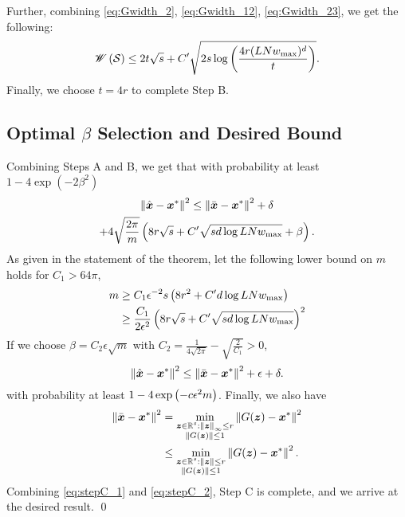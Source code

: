 \documentclass[journal]{IEEEtran}
\newcommand{\wid}{\mathscr{W}}
\begin{document}
Further, combining \eqref{eq:Gwidth_2}, \eqref{eq:Gwidth_12}, \eqref{eq:Gwidth_23}, we get the following:
\begin{equation}
\wid\lb \calS\rb\leq 2t\sqrt{s}+C'\sqrt{2s\log \lb\frac{4r(LNw_{\max})^d}{t}\rb}.
\end{equation}
Finally, we choose $t=4r$ to complete Step B.

\subsection{Optimal $\beta$ Selection and Desired Bound}
Combining  Steps A and B, we get that with probability at least $1-4\exp(-2\beta^2)$
\begin{multline}\label{eq:theory_1}
\left\Vert\hat{\boldsymbol{x}}-\boldsymbol{x}^*\right\Vert^2\leq \left\Vert\bar{\boldsymbol{x}}-\boldsymbol{x}^*\right\Vert^2+\delta\\+4\sqrt{\frac{2\pi }{m}}\left( 8r\sqrt{s}+C'\sqrt{sd\log LNw_{\max}} +\beta\right).
\end{multline}
As given in the statement of the theorem, let the following lower bound on $m$ holds for $C_1>64\pi$,
 \begin{align}\label{eq:num_mes}
m&\geq C_1\epsilon^{-2}s\left( 8r^2+C'd\log LNw_{\max} \right)\\
&\geq \frac{C_1}{2\epsilon^2}\left( 8r\sqrt{s}+C'\sqrt{sd\log LNw_{\max}} \right)^2
\end{align} 
If we choose $\beta= C_2\epsilon\sqrt{m}$ with $C_2=\frac{1}{4\sqrt{2\pi}}-\sqrt{\frac{2}{C_1}}>0$, 
\begin{equation}\label{eq:stepC_1}
\left\Vert\hat{\boldsymbol{x}}-\boldsymbol{x}^*\right\Vert^2\leq \left\Vert\bar{\boldsymbol{x}}-\boldsymbol{x}^*\right\Vert^2+\epsilon+\delta.
\end{equation}
 with probability at least $1-4\exp\left(-c\epsilon^2m\right)$. Finally, we also have
\begin{align}
\left\Vert\bar{\boldsymbol{x}}-\boldsymbol{x}^*\right\Vert^2 &= \underset{\substack{\boldsymbol{z}\in\mathbb{R}^s:\left\Vert\boldsymbol{z}\right\Vert_{\infty}\leq r\\\left\Vert G(\boldsymbol{z})\right\Vert\leq 1}}{\min}\left\Vert G(\boldsymbol{z})-\boldsymbol{x}^*\right\Vert^2\\
&\leq \underset{\substack{\boldsymbol{z}\in\mathbb{R}^s:\left\Vert\boldsymbol{z}\right\Vert\leq r\\\left\Vert G(\boldsymbol{z})\right\Vert\leq 1}}{\min}\left\Vert G(\boldsymbol{z})-\boldsymbol{x}^*\right\Vert^2.\label{eq:stepC_2}
\end{align} 
 Combining \eqref{eq:stepC_1} and \eqref{eq:stepC_2}, Step C is complete, and we arrive at the desired result. \hfill\qed
\end{document}
